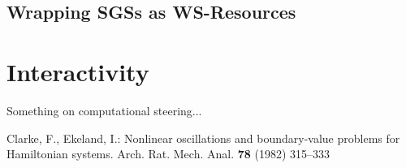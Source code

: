 \documentclass{llncs}
\begin{document}
\subsection{Wrapping SGSs as WS-Resources}




%

\section{Interactivity} \label{sec:interactivity}

Something on computational steering...
%
%
\begin{thebibliography}{refs}
%
%
Clarke, F., Ekeland, I.:
Nonlinear oscillations and
boundary-value problems for Hamiltonian systems.
Arch. Rat. Mech. Anal. {\bf 78} (1982) 315--333

\end{thebibliography}
\end{document}

